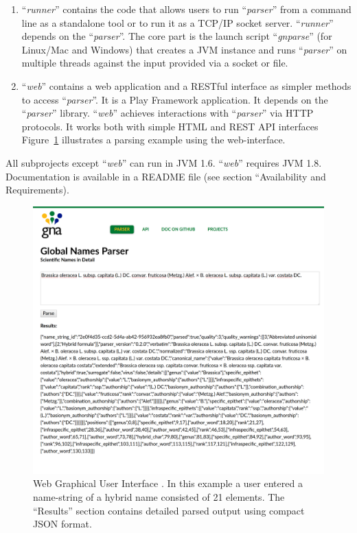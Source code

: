 \documentclass{bmcart}
\begin{document}
\begin{enumerate}
  \item ``\textit{runner}'' contains the code that allows users to run
    ``\textit{parser}'' from a command line as a standalone tool or to run it
    as a TCP/IP socket server. ``\textit{runner}'' depends on the
    ``\textit{parser}''.   The core part is the launch script
    ``\textit{gnparse}'' (for Linux/Mac and Windows) that creates a JVM instance
    and runs ``\textit{parser}'' on multiple threads against the input provided
    via a socket or file.

  \item ``\textit{web}'' contains a web application and a RESTful interface as
    simpler methods to access ``\textit{parser}''. It is a Play Framework
    \cite{wampler2011scala} application. It depends on the ``\textit{parser}''
    library. ``\textit{web}'' achieves interactions with ``\textit{parser}''
    via HTTP protocols. It works both with simple HTML and REST API interfaces
    Figure~\ref{figure:webgui} illustrates a parsing example using the web-interface.

\end{enumerate}

All subprojects except ``\textit{web}'' can run in JVM 1.6. ``\textit{web}''
requires JVM 1.8. Documentation is available in a README file (see section ``Availability and Requirements).

\begin{figure}[htbp]
  \begin{center}

    \caption{Web Graphical User Interface \cite{gnparser-web}. In this example
      a user entered a name-string of a hybrid name consisted of 21 elements.
      The ``Results'' section contains detailed parsed output using compact
      JSON format.}\label{figure:webgui}

    \vspace{5mm}
    \includegraphics[scale=0.175]{images/web_gui.png}
  \end{center}
\end{figure}
\end{document}
